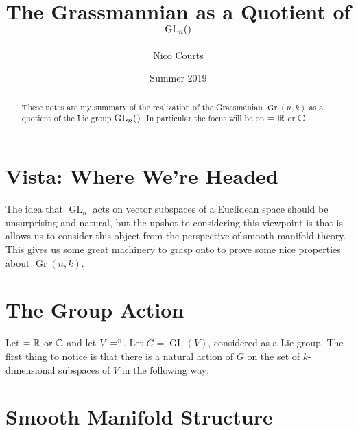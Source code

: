 \documentclass[12pt]{article}
\DeclareMathOperator{\Gr}{Gr}
\DeclareMathOperator{\GL}{GL}
\let\k\relax
\newcommand{\k}{\mathbbm{k}}
\begin{document}
\title{The Grassmannian as a Quotient of $\GL_n(\k)$ \vspace{-1ex}}
\author{Nico Courts}
\date{Summer 2019}
\maketitle

\renewcommand{\abstractname}{Introduction}
\begin{abstract}
	These notes are my summary of the realization of the Grassmanian $\Gr(n,k)$ as a quotient of 
	the Lie group $\GL_n(\k)$. In particular the focus will be on $\k=\bbR$ or $\mathbb{C}$.
\end{abstract}

\section*{Vista: Where We're Headed}
The idea that $\GL_n$ acts on vector subspaces of a Euclidean space should be unsurprising and natural, but 
the upshot to considering this viewpoint is that is allows us to consider this object from the perspective of smooth 
manifold theory. This gives us some great machinery to grasp onto to prove some nice properties 
about $\Gr(n,k)$.

\section{The Group Action}
Let $\k=\bbR$ or $\mathbb{C}$ and let $V=\k^n$. Let $G=\GL(V)$, considered as a Lie group. The first thing to notice is that there is a natural action 
of $G$ on the set of $k$-dimensional subspaces of $V$ in the following way:
\section{Smooth Manifold Structure}


\medskip

\printbibliography
\end{document}
